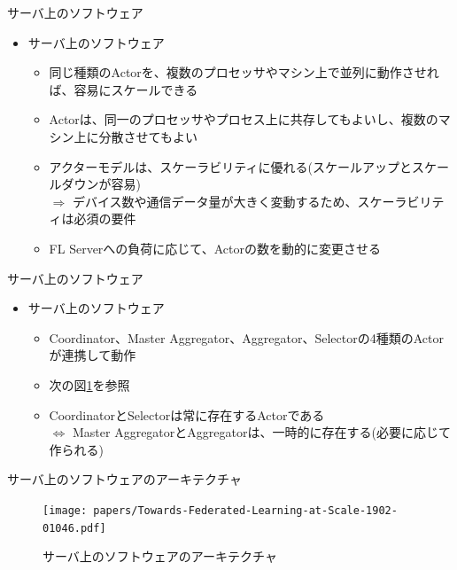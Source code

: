 \documentclass[dvipdfmx,notheorems,t]{beamer}
\begin{document}
\begin{frame}{サーバ上のソフトウェア}

\begin{itemize}
	\item サーバ上のソフトウェア
	\begin{itemize}		
		\item 同じ種類のActorを、複数のプロセッサやマシン上で並列に動作させれば、容易にスケールできる
		\item Actorは、同一のプロセッサやプロセス上に共存してもよいし、複数のマシン上に分散させてもよい
		\newline
		
		\item アクターモデルは、\alert{スケーラビリティ}に優れる(スケールアップとスケールダウンが容易) \\
		$\Rightarrow$ デバイス数や通信データ量が大きく変動するため、スケーラビリティは必須の要件
		\newline
		
		\item FL Serverへの負荷に応じて、Actorの数を動的に変更させる
	\end{itemize}
\end{itemize}

\end{frame}

\begin{frame}{サーバ上のソフトウェア}

\begin{itemize}
	\item サーバ上のソフトウェア
	\begin{itemize}
		\item \alert{Coordinator}、\alert{Master Aggregator}、\alert{Aggregator}、\alert{Selector}の4種類のActorが連携して動作
		\item 次の図\ref{fig:fl-server-arch}を参照
		\newline
		
		\item CoordinatorとSelectorは常に存在するActorである \\
		$\Leftrightarrow$ Master AggregatorとAggregatorは、一時的に存在する(必要に応じて作られる)
	\end{itemize}
\end{itemize}

\end{frame}

\begin{frame}{サーバ上のソフトウェアのアーキテクチャ}

\begin{figure}
	\centering
	\texttt{[image: papers/Towards-Federated-Learning-at-Scale-1902-01046.pdf]}
	\caption{サーバ上のソフトウェアのアーキテクチャ~\cite{DBLP:journals/corr/abs-1902-01046}}
	\label{fig:fl-server-arch}
\end{figure}

\end{frame}
\end{document}
